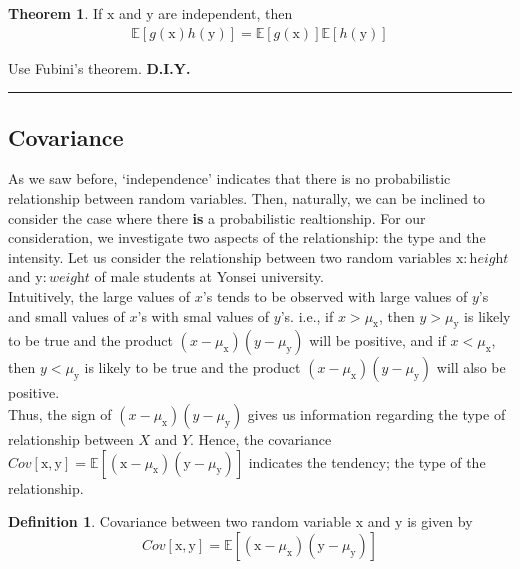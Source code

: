 \documentclass[twoside]{article}
\theoremstyle{definition}
\newtheorem{definition}{Definition}[section]
\newtheorem{theorem}{Theorem}[section]
\theoremstyle{remark}
\theoremstyle{remark}
\newenvironment{prf}{{\bf Proof:}}{\hfill\rule{2mm}{2mm}}
\begin{document}
\begin{theorem}
  If $\mathrm{x}$ and $\mathrm{y}$ are independent, then
  \begin{equation}
    \begin{split}
      \mathbb{E}[g(\mathrm{x})h(\mathrm{y})] = \mathbb{E}[g(\mathrm{x})]\mathbb{E}[h(\mathrm{y})]
    \end{split}
  \end{equation}
\end{theorem}
\begin{prf}
  Use Fubini's theorem. \textbf{D.I.Y.}
\end{prf}


\subsection{Covariance}
As we saw before, `independence' indicates that there is no probabilistic relationship
between random variables. Then, naturally, we can be inclined to consider the case
where there \textbf{is} a probabilistic realtionship. For our consideration, we
investigate two aspects of the relationship: the type and the intensity. Let us
consider the relationship between two random variables $\mathrm{x}: \textit{height}$
and $\mathrm{y}: \textit{weight}$ of male students at Yonsei university.
\\[0.5\baselineskip]
Intuitively, the large values of $x$'s tends to be observed with large values of $y$'s
and small values of $x$'s with smal values of $y$'s. i.e., if $x > \mu_\mathrm{x}$,
then $y > \mu_\mathrm{y}$ is likely to be true and the product $(x-\mu_\mathrm{x})
(y - \mu_\mathrm{y})$ will be positive, and if $x < \mu_\mathrm{x}$, then
$y < \mu_\mathrm{y}$ is likely to be true and the product $(x-\mu_\mathrm{x})
(y - \mu_\mathrm{y})$ will also be positive.
\\[0.5\baselineskip]
Thus, the sign of $(x-\mu_\mathrm{x})(y - \mu_\mathrm{y})$ gives us information
regarding the type of relationship between $X$ and $Y$. Hence, the covariance
$Cov[\mathrm{x}, \mathrm{y}] = \mathbb{E}[(\mathrm{x} - \mu_\mathrm{x})(\mathrm{y} - \mu_\mathrm{y})]$
indicates the tendency; the type of the relationship.
\begin{definition}
  Covariance between two random variable $\mathrm{x}$ and $\mathrm{y}$ is given by
  \begin{equation}
    Cov[\mathrm{x}, \mathrm{y}] = \mathbb{E}[(\mathrm{x} - \mu_\mathrm{x})(\mathrm{y} - \mu_\mathrm{y})]
  \end{equation}
\end{definition}
\end{document}
